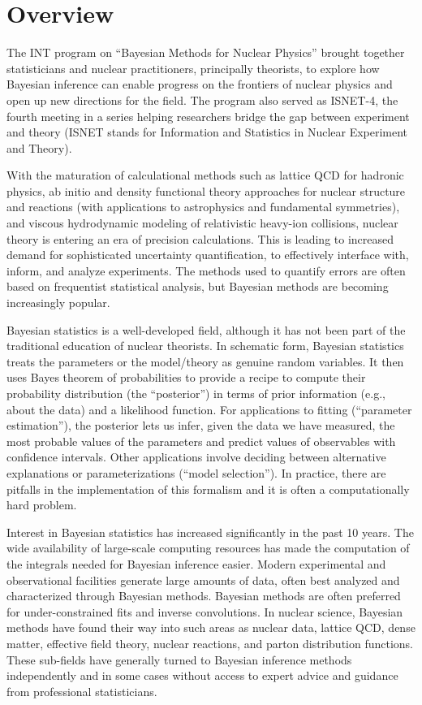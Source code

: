 
\section{Overview}  \label{sec:overview}

\bi
  \I The INT program on ``Bayesian Methods for Nuclear Physics'' brought together statisticians
      and nuclear practitioners, principally theorists, to explore how Bayesian
	  inference can enable progress on the frontiers of nuclear
	  physics and open up new directions for the field.
  \I The program also served as ISNET-4, the fourth meeting in a series helping researchers
      bridge the gap between experiment and theory
      (ISNET stands for Information and Statistics in Nuclear Experiment and Theory).   
\ei

With the maturation of calculational methods such as lattice QCD for hadronic
physics, ab initio and density functional theory approaches for nuclear
structure and reactions (with applications to astrophysics and fundamental
symmetries), and viscous hydrodynamic modeling of relativistic heavy-ion
collisions, nuclear theory is entering an era of precision calculations. This
is leading to increased demand for sophisticated uncertainty quantification,
to effectively interface with, inform, and analyze experiments. The methods
used to quantify errors are often based on frequentist statistical analysis,
but Bayesian methods are becoming increasingly popular.

Bayesian statistics is a well-developed field, although it has not been part
of the traditional education of nuclear theorists. In schematic form, Bayesian
statistics treats the parameters or the model/theory as genuine random
variables. It then uses Bayes theorem of probabilities to provide a recipe to
compute their probability distribution (the “posterior”) in terms of prior
information (e.g., about the data) and a likelihood function. For applications
to fitting (“parameter estimation”), the posterior lets us infer, given the
data we have measured, the most probable values of the parameters and predict
values of observables with confidence intervals. Other applications involve
deciding between alternative explanations or parameterizations (“model
selection”). In practice, there are pitfalls in the implementation of this
formalism and it is often a computationally hard problem.

Interest in Bayesian statistics has increased significantly in the past 10
years. The wide availability of large-scale computing resources has made the
computation of the integrals needed for Bayesian inference easier. Modern
experimental and observational facilities generate large amounts of data,
often best analyzed and characterized through Bayesian methods. Bayesian
methods are often preferred for under-constrained fits and inverse
convolutions. In nuclear science, Bayesian methods have found their way into
such areas as nuclear data, lattice QCD, dense matter, effective field theory,
nuclear reactions, and parton distribution functions. These sub-fields have
generally turned to Bayesian inference methods independently and in some cases
without access to expert advice and guidance from professional statisticians.


